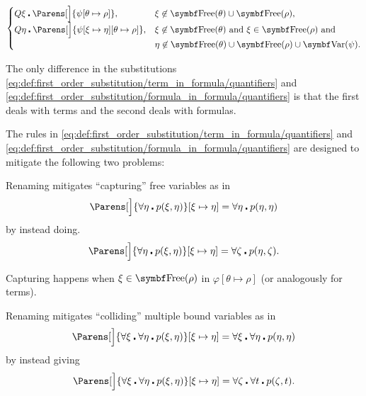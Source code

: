 \begin{definition}
\begin{DefEnum}
\begin{equation}
\begin{cases}
        Q \xi \centerdot \Parens[\Big]{\psi[\theta \mapsto \rho]},                    &\xi \not\in \Bold{Free}(\theta) \cup \Bold{Free}(\rho), \\
        Q \eta \centerdot \Parens[\Big]{\psi[\xi \mapsto \eta][\theta \mapsto \rho]}, &\xi \not\in \Bold{Free}(\theta) \T{and} \xi \in \Bold{Free}(\rho) \T{and} \\
                                                                                      &\eta \not\in \Bold{Free}(\theta) \cup \Bold{Free}(\rho) \cup \Bold{Var}(\psi).
      \end{cases}
    \end{equation}

    The only difference in the substitutions \eqref{eq:def:first_order_substitution/term_in_formula/quantifiers} and \eqref{eq:def:first_order_substitution/formula_in_formula/quantifiers} is that the first deals with terms and the second deals with formulas.
  \end{DefEnum}
\end{definition}

\begin{remark}\label{remark:first_order_substitution_renaming_justification}
  The rules in \eqref{eq:def:first_order_substitution/term_in_formula/quantifiers} and \eqref{eq:def:first_order_substitution/formula_in_formula/quantifiers} are designed to mitigate the following two problems:

  \begin{RemEnum}
     Renaming mitigates \enquote{capturing} free variables as in
    \begin{equation*}
      \Parens[\Big]{ \forall \eta \centerdot p(\xi, \eta) }[\xi \mapsto \eta] = \forall \eta \centerdot p(\eta, \eta)
    \end{equation*}
    by instead doing.
    \begin{equation*}
      \Parens[\Big]{ \forall \eta \centerdot p(\xi, \eta) }[\xi \mapsto \eta] = \forall \zeta \centerdot p(\eta, \zeta).
    \end{equation*}

    Capturing happens when \( \xi \in \Bold{Free}(\rho) \) in \( \varphi[\theta \mapsto \rho] \) (or analogously for terms).

     Renaming mitigates \enquote{colliding} multiple bound variables as in
    \begin{equation*}
      \Parens[\Big]{ \forall \xi \centerdot \forall \eta \centerdot p(\xi, \eta) }[\xi \mapsto \eta] = \forall \xi \centerdot \forall \eta \centerdot p(\eta, \eta)
    \end{equation*}
    by instead giving
    \begin{equation*}
      \Parens[\Big]{ \forall \xi \centerdot \forall \eta \centerdot p(\xi, \eta) }[\xi \mapsto \eta] = \forall \zeta \centerdot \forall t \centerdot p(\zeta, t).
    \end{equation*}
  \end{RemEnum}
\end{remark}

